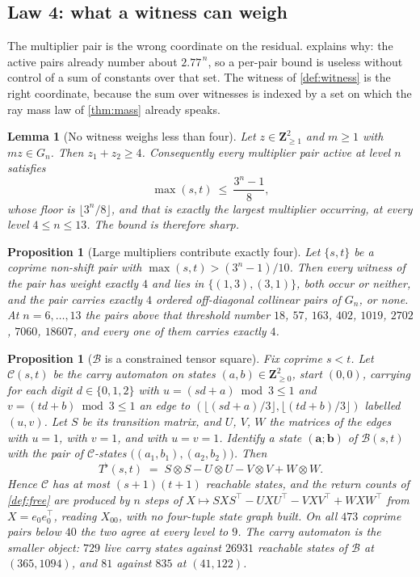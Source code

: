 \documentclass[11pt]{amsart}
\newtheorem{proposition}[theorem]{Proposition}
\newtheorem{lemma}[theorem]{Lemma}
\theoremstyle{definition}
\theoremstyle{remark}
\begin{document}
\subsection{Law 4: what a witness can weigh}

The multiplier pair is the wrong coordinate on the residual.  explains why: the active pairs already number about $2.77^{\,n}$, so a per-pair bound is useless without control of a sum of constants over that set. The witness of \cref{def:witness} is the right coordinate, because the sum over witnesses is indexed by a set on which the ray mass law of \cref{thm:mass} already speaks.

\begin{lemma}[No witness weighs less than four]
\label{lem:weight}
Let $z\in\mathbf{Z}_{\ge 1}^2$ and $m\ge 1$ with $mz\in G_n$. Then $z_1+z_2\ge 4$. Consequently every multiplier pair active at level $n$ satisfies
\[
\max(s,t)\ \le\ \frac{3^n-1}{8},
\]
whose floor is $\lfloor 3^n/8\rfloor$, and that is exactly the largest multiplier occurring, at every level $4\le n\le 13$. The bound is therefore sharp.
\end{lemma}

\begin{proposition}[Large multipliers contribute exactly four]
\label{prop:topband}
Let $\{s,t\}$ be a coprime non-shift pair with $\max(s,t)>(3^n-1)/10$. Then every witness of the pair has weight exactly $4$ and lies in $\{(1,3),(3,1)\}$, both occur or neither, and the pair carries exactly $4$ ordered off-diagonal collinear pairs of $G_n$, or none. At $n=6,\dots,13$ the pairs above that threshold number $18$, $57$, $163$, $402$, $1019$, $2702$, $7060$, $18607$, and every one of them carries exactly $4$.
\end{proposition}

\begin{proposition}[$\mathcal{B}$ is a constrained tensor square]
\label{prop:tensor}
Fix coprime $s<t$. Let $\mathcal{C}(s,t)$ be the \emph{carry automaton} on states $(a,b)\in\mathbf{Z}_{\ge 0}^2$, start $(0,0)$, carrying for each digit $d\in\{0,1,2\}$ with $u=(sd+a)\bmod 3\le 1$ and $v=(td+b)\bmod 3\le 1$ an edge to $(\lfloor (sd+a)/3\rfloor,\lfloor (td+b)/3\rfloor)$ labelled $(u,v)$. Let $S$ be its transition matrix, and $U$, $V$, $W$ the matrices of the edges with $u=1$, with $v=1$, and with $u=v=1$. Identify a state $(\mathbf{a};\mathbf{b})$ of $\mathcal{B}(s,t)$ with the pair of $\mathcal{C}$-states $\bigl((a_1,b_1),(a_2,b_2)\bigr)$. Then
\[
T^\flat(s,t)\;=\;S\otimes S-U\otimes U-V\otimes V+W\otimes W .
\]
Hence $\mathcal{C}$ has at most $(s+1)(t+1)$ reachable states, and the return counts of \cref{def:free} are produced by $n$ steps of $X\mapsto SXS^{\top}-UXU^{\top}-VXV^{\top}+WXW^{\top}$ from $X=e_0e_0^{\top}$, reading $X_{00}$, with no four-tuple state graph built. On all $473$ coprime pairs below $40$ the two agree at every level to $9$. The carry automaton is the smaller object: $729$ live carry states against $26931$ reachable states of $\mathcal{B}$ at $(365,1094)$, and $81$ against $835$ at $(41,122)$.
\end{proposition}
\end{document}
